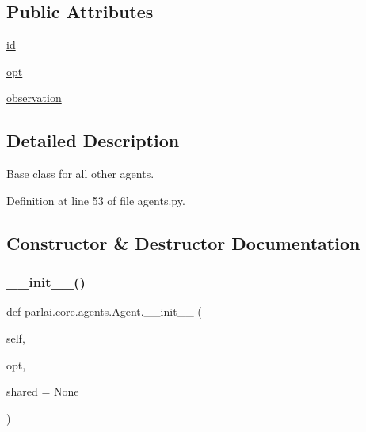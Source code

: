 \subsection*{Public Attributes}
\begin{DoxyCompactItemize}
\item 
\hyperlink{classparlai_1_1core_1_1agents_1_1Agent_ac00c13f4c7dd1263bf9203fa96dd2366}{id}
\item 
\hyperlink{classparlai_1_1core_1_1agents_1_1Agent_ab3b45d2754244608c75d4068b90cd051}{opt}
\item 
\hyperlink{classparlai_1_1core_1_1agents_1_1Agent_aedbecc4b4aa7af7413882a0429e0f1db}{observation}
\end{DoxyCompactItemize}


\subsection{Detailed Description}
\begin{DoxyVerb}Base class for all other agents.\end{DoxyVerb}
 

Definition at line 53 of file agents.\+py.



\subsection{Constructor \& Destructor Documentation}
\mbox{\label{classparlai_1_1core_1_1agents_1_1Agent_aa7992ab392e2803607937e805ceb176f}} 
\subsubsection{\texorpdfstring{\+\_\+\+\_\+init\+\_\+\+\_\+()}{\_\_init\_\_()}}
{\footnotesize\ttfamily def parlai.\+core.\+agents.\+Agent.\+\_\+\+\_\+init\+\_\+\+\_\+ (\begin{DoxyParamCaption}\item[{}]{self,  }\item[{}]{opt,  }\item[{}]{shared = {\ttfamily None} }\end{DoxyParamCaption})}



